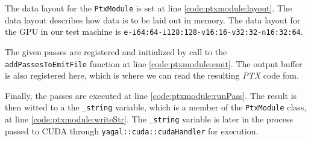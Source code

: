 The data layout for the \texttt{PtxModule} is set at line \ref{code:ptxmodule:layout}. The data layout describes how data is to be laid out in memory. The data layout for the GPU in our test machine is \texttt{e-i64:64-i128:128-v16:16-v32:32-n16:32:64}.

The given passes are registered and initialized by call to the \texttt{addPassesToEmitFile} function at line \ref{code:ptxmodule:emit}. The output buffer is also registered here, which is where we can read the resulting \textit{PTX} code fom.

Finally, the passes are executed at line \ref{code:ptxmodule:runPass}. The result is then witted to a the \texttt{\_string} variable, which is a member of the \texttt{PtxModule} class, at line \ref{code:ptxmodule:writeStr}. The \texttt{\_string} variable is later in the process passed to CUDA through \texttt{yagal::cuda::cudaHandler} for execution.

